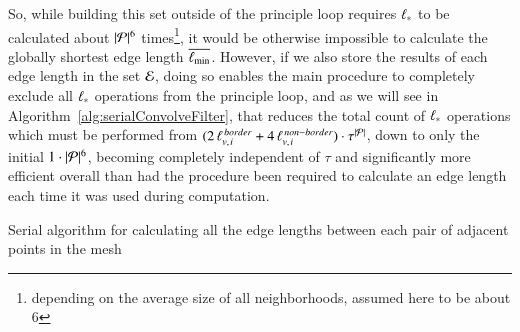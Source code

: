 So, while building this set outside of the principle loop requires ${\ell_\ast}$ to be calculated about $|\mathcal{P}|^6$ times\footnote{depending on the average size of all neighborhoods, assumed here to be about 6}, it would be otherwise impossible to calculate the globally shortest edge length $\overline{\ell_\text{min}}$. However, if we also store the results of each edge length in the set $\mathcal{E}$, doing so enables the main procedure to completely exclude all $\ell_\ast$ operations from the principle loop, and as we will see in Algorithm~\ref{alg:serialConvolveFilter}, that reduces the total count of $\ell_\ast$ operations which must be performed from $(2\,\ell_{v,\kern.75pt i}^{\,border} + 4\,\ell_{v,\kern.75pt i}^{\,non-border})\cdot\tau^{|\mathcal{P}|}$, down to only the initial $1\cdot |\mathcal{P}|^6$, becoming completely independent of $\tau$ and significantly more efficient overall than had the procedure been required to calculate an edge length each time it was used during computation.%
%
%

\begin{algorithm}[h]
	\DontPrintSemicolon


	\bigskip
	\FuncArgSty{($\bP$,\,$\bN$)}\;
\nl	{}
	\caption{Serial algorithm for calculating all the edge lengths between each pair of adjacent points in the mesh\label{alg:serialCalculateEdgeLengths}}
\end{algorithm}

